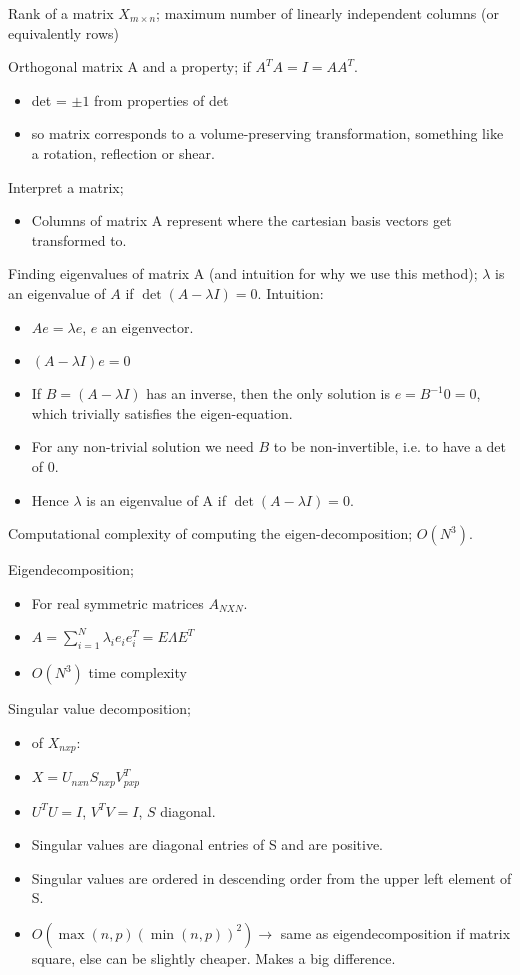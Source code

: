 \documentclass{article}
\begin{document}
Rank of a matrix $X_{m\times n}$; maximum number of linearly independent columns (or equivalently rows)

Orthogonal matrix A and a property; if $A^TA=I=AA^T$. \begin{itemize} \item det = $\pm 1$ from properties of det \item so matrix corresponds to a volume-preserving transformation, something like a rotation, reflection or shear. \end{itemize}
	
Interpret a matrix; \begin{itemize} \item Columns of matrix A represent where the cartesian basis vectors get transformed to. \end{itemize}

Finding eigenvalues of matrix A (and intuition for why we use this method); $\lambda$ is an eigenvalue of $A$ if $\det(A-\lambda I) = 0$. Intuition: \begin{itemize} \item $Ae=\lambda e$, $e$ an eigenvector. \item $(A-\lambda I)e=0$ \item If $B=(A-\lambda I)$ has an inverse, then the only solution is $e=B^{-1}0 = 0$, which trivially satisfies the eigen-equation. \item For any non-trivial solution we need $B$ to be non-invertible, i.e. to have a det of 0. \item Hence $\lambda$ is an eigenvalue of A if $\det(A-\lambda I) = 0$. \end{itemize}

Computational complexity of computing the eigen-decomposition; $O(N^3)$.

Eigendecomposition; \begin{itemize} \item For real symmetric matrices $A_{NXN}$. \item $A = \sum_{i=1}^N \lambda_i e_i e_i^T = E\Lambda E^T$ \item $O(N^3)$ time complexity \end{itemize}

Singular value decomposition; \begin{itemize} \item of $X_{nxp}$:  \item $X = U_{nxn}S_{nxp}V^T_{pxp}$ \item $U^TU=I$, $V^TV=I$, $S$ diagonal. \item Singular values are diagonal entries of S and are positive.  \item Singular values are ordered in descending order from the upper left element of S. \item $O(\max(n,p)(\min(n,p))^2) \rightarrow$ same as eigendecomposition if matrix square, else can be slightly cheaper. Makes a big difference. \end{itemize}
\end{document}
